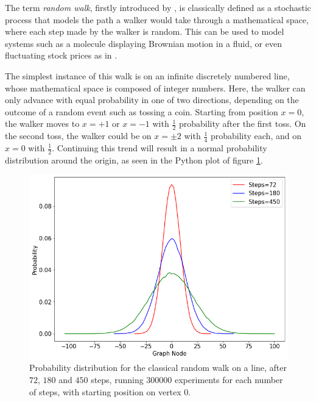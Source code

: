 \documentclass[../../dissertation.tex]{subfiles}
\begin{document}
The term \textit{random walk}, firstly introduced by \cite{kpearson1905}, is
classically defined as a stochastic process that models the path a walker would
take through a mathematical space, where each step made by the walker is
random. This can be used to model systems such as a molecule displaying
Brownian motion in a fluid, or even fluctuating stock prices as in
\cite{sottinen2001}.\par The simplest instance of this walk is on an infinite
discretely numbered line, whose mathematical space is composed of integer
numbers. Here, the walker can only advance with equal probability in one of two
directions, depending on the outcome of a random event such as tossing a coin.
Starting from position $x=0$, the walker moves to $x = +1$ or $ x = -1$ with
$\frac{1}{2}$ probability after the first toss. On the second toss, the walker
could be on $x =\pm 2$ with $\frac{1}{4}$ probability each, and on $x = 0$ with
$\frac{1}{2}$.  Continuing this trend will result in a normal probability
distribution around the origin, as seen in the Python plot of figure
\ref{fig:MultClassicalWalk72180450}.
\begin{figure}[!h]
	\centering
	\includegraphics[scale=0.40]{img/ClassicalWalk/MultClassicalWalk72180450}
	\caption{Probability distribution for the classical random walk on a line, after $72$, $180$ and $450$ steps, running $300000$ experiments for each number of steps, with starting position on vertex $0$.} 
	\label{fig:MultClassicalWalk72180450}
\end{figure}\par
\end{document}
